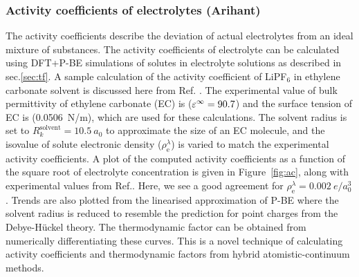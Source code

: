 \documentclass[../main.tex]{subfiles}
\begin{document}
\subsubsection{Activity coefficients of electrolytes (Arihant)}
The activity coefficients describe the deviation of actual electrolytes from an ideal mixture of substances.\cite{Atkins2014} The activity coefficients of electrolyte can be calculated using DFT+P-BE simulations of solutes in electrolyte solutions as described in sec.\ref{sec:tf}. A sample calculation of the activity coefficient of LiPF$_6$ in ethylene carbonate solvent is discussed here from Ref. . The experimental value of bulk permittivity of ethylene carbonate (EC) is ($\varepsilon^\infty=90.7$)\cite{Hall2015} and the surface tension of EC is (0.0506~N/m),\cite{Naejus2002} which are used for these calculations. The solvent radius is set to $R^\textrm{solvent}_k= 10.5~a_0$ to approximate the size of an EC molecule, and the isovalue of solute electronic density ($\rho_{\textrm{e}}^\lambda$) is varied to match the experimental activity coefficients. A plot of the computed activity coefficients as a function of the square root of electrolyte concentration is given in Figure~\ref{fig:ac}, along with experimental values from Ref.. Here, we see a good agreement for $\rho_{\textrm{e}}^\lambda=0.002~e/a_0^3$. Trends are also plotted from the linearised approximation of P-BE where the solvent radius is reduced to resemble the prediction for point charges from the Debye-H\"uckel theory.\cite{debye1923theory} The thermodynamic factor can be obtained from numerically differentiating these curves. This is a novel technique of calculating activity coefficients and thermodynamic factors from hybrid atomistic-continuum methods.
\end{document}
